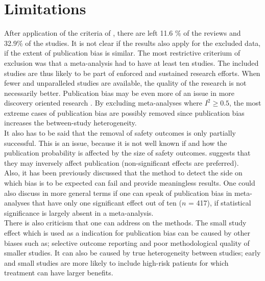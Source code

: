 \documentclass[11pt,a4paper,twoside]{book}\usepackage[]{graphicx}\usepackage[]{color}
\begin{document}
\section{Limitations}
After application of the criteria of \citet{Ioannidis2007}, there are left 11.6 \% of the reviews and 32.9\% of the studies. It is not clear if the results also apply for the excluded data, \ie if the extent of publication bias is similar. The most restrictive criterium of exclusion was that a meta-analysis had to have at least ten studies. The included studies are thus likely to be part of enforced and sustained research efforts. When fewer and unparalleled studies are available, the quality of the research is not necessarily better. Publication bias may be even more of an issue in more discovery oriented research \citet{ioannidis.2005}. By excluding meta-analyses where $I^2 \geq 0.5$, the most extreme cases of publication bias are possibly removed since publication bias increases the between-study heterogeneity.\\
It also has to be said that the removal of safety outcomes is only partially successful. This is an issue, because it is not well known if and how the publication probability is affected by the size of safety outcomes. \citet{kicinsky} suggests that they may inversely affect publication (\ie non-significant effects are preferred).\\
Also, it has been previously discussed that the method to detect the side on which bias is to be expected can fail and provide meaningless results. One could also discuss in more general terms if one can speak of publication bias in meta-analyses that have only one significant effect out of ten ($n$ = 417), \ie if statistical significance is largely absent in a meta-analysis.\\
There is also criticism that one can address on the methods. The small study effect which is used as a indication for publication bias can be caused by other biases such as; selective outcome reporting and poor methodological quality of smaller studies. It can also be caused by true heterogeneity between studies; early and small studies are more likely to include high-risk patients for which treatment can have larger benefits. \\
\end{document}
